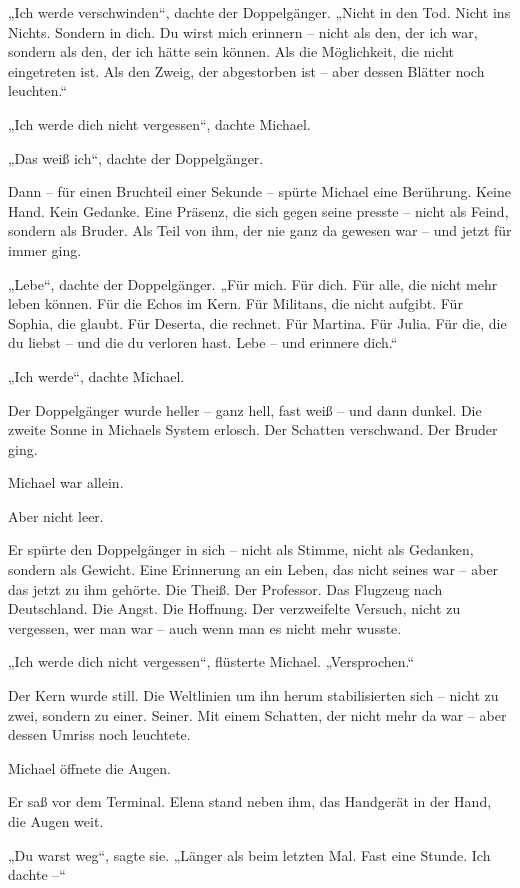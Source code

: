 \documentclass[
]{article}
\begin{document}
„Ich werde verschwinden``, dachte der Doppelgänger. „Nicht in den Tod. Nicht ins Nichts. Sondern in dich. Du wirst mich erinnern -- nicht als den, der ich war, sondern als den, der ich hätte sein können. Als die Möglichkeit, die nicht eingetreten ist. Als den Zweig, der abgestorben ist -- aber dessen Blätter noch leuchten.``

„Ich werde dich nicht vergessen``, dachte Michael.

„Das weiß ich``, dachte der Doppelgänger.

Dann -- für einen Bruchteil einer Sekunde -- spürte Michael eine Berührung. Keine Hand. Kein Gedanke. Eine Präsenz, die sich gegen seine presste -- nicht als Feind, sondern als Bruder. Als Teil von ihm, der nie ganz da gewesen war -- und jetzt für immer ging.

„Lebe``, dachte der Doppelgänger. „Für mich. Für dich. Für alle, die nicht mehr leben können. Für die Echos im Kern. Für Militans, die nicht aufgibt. Für Sophia, die glaubt. Für Deserta, die rechnet. Für Martina. Für Julia. Für die, die du liebst -- und die du verloren hast. Lebe -- und erinnere dich.``

„Ich werde``, dachte Michael.

Der Doppelgänger wurde heller -- ganz hell, fast weiß -- und dann dunkel. Die zweite Sonne in Michaels System erlosch. Der Schatten verschwand. Der Bruder ging.

Michael war allein.

Aber nicht leer.

Er spürte den Doppelgänger in sich -- nicht als Stimme, nicht als Gedanken, sondern als Gewicht. Eine Erinnerung an ein Leben, das nicht seines war -- aber das jetzt zu ihm gehörte. Die Theiß. Der Professor. Das Flugzeug nach Deutschland. Die Angst. Die Hoffnung. Der verzweifelte Versuch, nicht zu vergessen, wer man war -- auch wenn man es nicht mehr wusste.

„Ich werde dich nicht vergessen``, flüsterte Michael. „Versprochen.``

Der Kern wurde still. Die Weltlinien um ihn herum stabilisierten sich -- nicht zu zwei, sondern zu einer. Seiner. Mit einem Schatten, der nicht mehr da war -- aber dessen Umriss noch leuchtete.

Michael öffnete die Augen.

Er saß vor dem Terminal. Elena stand neben ihm, das Handgerät in der Hand, die Augen weit.

„Du warst weg``, sagte sie. „Länger als beim letzten Mal. Fast eine Stunde. Ich dachte --``
\end{document}
